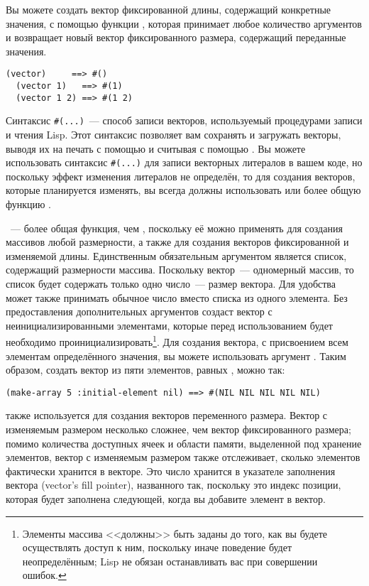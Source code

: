 Вы можете создать вектор фиксированной длины, содержащий конкретные значения, с помощью
функции , которая принимает любое количество аргументов и возвращает
новый вектор фиксированного размера, содержащий переданные значения.

\begin{lstlisting}[style=lisprepl]
  (vector)     ==> #()
  (vector 1)   ==> #(1)
  (vector 1 2) ==> #(1 2)
\end{lstlisting}

Синтаксис \lstinline!#(...)!~--- способ записи векторов, используемый процедурами
записи и чтения Lisp.  Этот синтаксис позволяет вам сохранять и загружать векторы,
выводя их на печать с помощью  и считывая с помощью .
Вы можете использовать синтаксис \lstinline!#(...)! для
записи векторных литералов в вашем коде, но поскольку эффект изменения литералов не определён,
то для создания векторов, которые планируется изменять, вы всегда должны 
использовать  или более общую функцию .

~--- более общая функция, чем , поскольку её можно
применять для создания массивов любой размерности, а также для создания векторов
фиксированной и изменяемой длины. Единственным обязательным аргументом 
является список, содержащий размерности массива.  Поскольку вектор~--- одномерный массив,
то список будет содержать только одно число~--- размер вектора.  Для удобства
 может также принимать обычное число вместо списка из одного элемента.
Без предоставления дополнительных аргументов  создаст вектор с
неинициализированными элементами, которые перед использованием будет необходимо
проинициализировать\footnote{Элементы массива <<должны>> быть заданы до того, как вы будете осуществлять
  доступ к ним, поскольку иначе поведение будет неопределённым; Lisp не обязан
  останавливать вас при совершении ошибок.}.  Для создания вектора, с присвоением всем
элементам определённого значения, вы можете использовать аргумент .
Таким образом, создать вектор из пяти элементов, равных , можно так:

\begin{lstlisting}[style=lisprepl]
  (make-array 5 :initial-element nil) ==> #(NIL NIL NIL NIL NIL)
\end{lstlisting}

 также используется для создания векторов переменного размера.
Вектор с изменяемым размером несколько сложнее, чем вектор фиксированного размера;
помимо количества доступных ячеек и области памяти, выделенной под хранение элементов,
вектор с изменяемым размером также отслеживает, сколько элементов фактически
хранится в векторе.  Это число хранится в указателе заполнения вектора (vector's fill
pointer), названного так, поскольку это индекс позиции, которая будет заполнена следующей,
когда вы добавите элемент в вектор.

